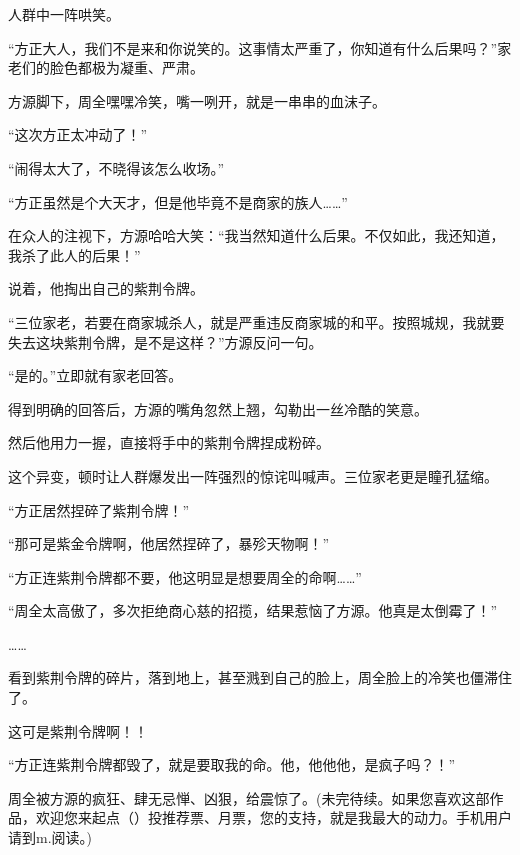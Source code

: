\begin{this_body}
人群中一阵哄笑。

“方正大人，我们不是来和你说笑的。这事情太严重了，你知道有什么后果吗？”家老们的脸色都极为凝重、严肃。

方源脚下，周全嘿嘿冷笑，嘴一咧开，就是一串串的血沫子。

“这次方正太冲动了！”

“闹得太大了，不晓得该怎么收场。”

“方正虽然是个大天才，但是他毕竟不是商家的族人……”

在众人的注视下，方源哈哈大笑：“我当然知道什么后果。不仅如此，我还知道，我杀了此人的后果！”

说着，他掏出自己的紫荆令牌。

“三位家老，若要在商家城杀人，就是严重违反商家城的和平。按照城规，我就要失去这块紫荆令牌，是不是这样？”方源反问一句。

“是的。”立即就有家老回答。

得到明确的回答后，方源的嘴角忽然上翘，勾勒出一丝冷酷的笑意。

然后他用力一握，直接将手中的紫荆令牌捏成粉碎。

这个异变，顿时让人群爆发出一阵强烈的惊诧叫喊声。三位家老更是瞳孔猛缩。

“方正居然捏碎了紫荆令牌！”

“那可是紫金令牌啊，他居然捏碎了，暴殄天物啊！”

“方正连紫荆令牌都不要，他这明显是想要周全的命啊……”

“周全太高傲了，多次拒绝商心慈的招揽，结果惹恼了方源。他真是太倒霉了！”

……

看到紫荆令牌的碎片，落到地上，甚至溅到自己的脸上，周全脸上的冷笑也僵滞住了。

这可是紫荆令牌啊！！

“方正连紫荆令牌都毁了，就是要取我的命。他，他他他，是疯子吗？！”

周全被方源的疯狂、肆无忌惮、凶狠，给震惊了。(未完待续。如果您喜欢这部作品，欢迎您来起点（）投推荐票、月票，您的支持，就是我最大的动力。手机用户请到m.阅读。)

\end{this_body}

